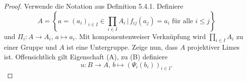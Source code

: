 \begin{proof}
Verwende die Notation aus Definition 5.4.1. Definiere
\[ A = \left\{
a=(a_i)_{i\in I} \in \prod_{i\in I}A_i \, \Big| \, f_{ij}(a_j) = a_i \text{ für alle } i \leq j
\right\}
\]
und $\Pi_i \colon A \to A_i, \, a \mapsto a_i$. Mit komponentenweiser Verknüpfung wird $ \prod_{i\in I}A_i$ zu einer Gruppe und $A$ ist eine Untergruppe. Zeige nun, dass $A$ projektiver Limes ist. 
Offensichtlich gilt Eigenschaft (A), zu (B) definiere 
\[ u \colon B \to A, \, b \mapsto (\Psi_i(b_i))_{i\in I}.
\]
\end{proof}